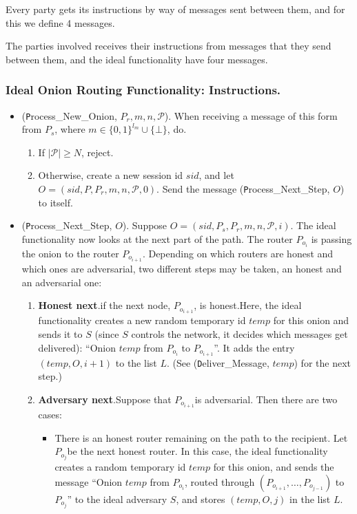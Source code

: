 Every party gets its instructions by way of messages sent between
them, and for this we define 4 messages.

The parties involved receives their instructions from messages that
they send between them, and the ideal functionality have four
messages. 

\subsubsection*{Ideal Onion Routing Functionality: Instructions.}

\begin{itemize}

\item{({\texttt Process_New_Onion}, \(P_r, m, n, \mathcal{P}\)). When
  receiving a message of this form from \(P_s\), where \(m\in
  \{0,1\}^{l_m}\cup\{\bot\}\), do.}
  \begin{enumerate}
  \item{If \(|\mathcal{P}| \geq N\), reject.}
  \item{Otherwise, create a new session id \(sid\), and let \(O =
    (sid, P, P_r, m, n, \mathcal{P}, 0)\). Send the message
    ({\texttt Process_Next_Step}, \(O\)) to itself.}
  \end{enumerate}

\item{({\texttt Process_Next_Step}, \(O\)). Suppose \(O = (sid, P_s,
  P_r, m, n, \mathcal{P}, i)\). The ideal functionality now looks at
  the next part of the path. The router \(P_{o_i}\) is passing the
  onion to the router \(P_{o_{i+1}}\). Depending on which routers are
  honest and which ones are adversarial, two different steps may be
  taken, an honest and an adversarial one:

  \begin{enumerate}
    
  \item{{\bf Honest next}.if the next node, \(P_{o_{i+1}}\), is
    honest.Here, the ideal functionality creates a new random temporary id
    \(temp\) for this onion and sends it to \(S\) (since \(S\) controls
    the network, it decides which messages get delivered): ``Onion
    \(temp\) from \(P_{o_i}\) to \(P_{o_{i+1}}\)''. It adds the entry
    \((temp, O, i+1)\) to the list \(L\). (See ({\texttt Deliver_Message},
    \(temp\)) for the next step.)}

  \item{{\bf Adversary next}.Suppose that \(P_{o_{i+1}}\)is
    adversarial. Then there are two cases:
    \begin{itemize}
    \item{There is an honest router remaining on the path to the
      recipient. Let \(P_{o_j}\)be the next honest router. In this
      case, the ideal functionality creates a random temporary id
      \(temp\) for this onion, and sends the message ``Onion \(temp\)
      from \(P_{o_i}\), routed through \((P_{o_{i+1}}, \ldots,
      P_{o_{j-1}})\) to \(P_{o_j}\)'' to the ideal adversary \(S\),
      and stores \((temp, O, j) \) in the list \(L\).}
      

\end{itemize}}
\end{enumerate}}
\end{itemize}
